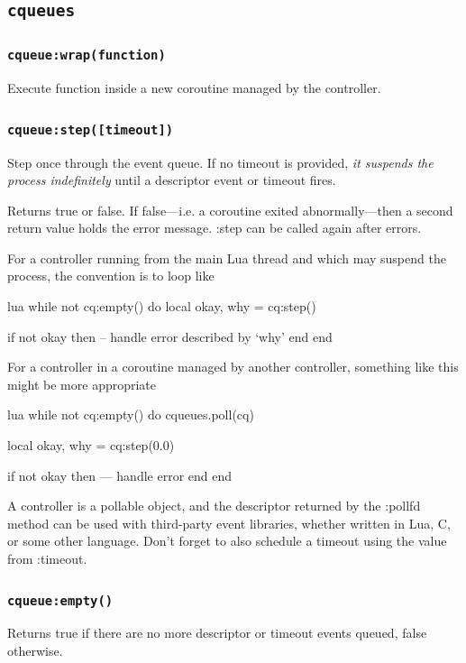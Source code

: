 \documentclass[11pt, oneside]{memoir}
\newcommand*{\cqueues}[0]{\texttt{cqueues}\xspace}
\newcommand*{\routine}[1]{\texttt{#1}\xspace}
\newcounter{toccols}
\newenvironment{Module}[1]{
	\subsection{\texttt{#1}}
	\addtocontents{toc}{
		\protect\begin{multicols}{\value{toccols}}
	}
}{
	\addtocontents{toc}{\protect\end{multicols}}
}
\begin{document}
\begin{Module}{\cqueues}
\subsubsection[\routine{cqueues:wrap}]{\routine{cqueue:wrap(function)}}
        Execute function inside a new coroutine managed by the controller.

\subsubsection[\routine{cqueues:step}]{\routine{cqueue:step([timeout])}}
Step once through the event queue. If no timeout is provided, \emph{it suspends the process indefinitely} until a descriptor event or timeout fires.

Returns true or false. If false---i.e. a coroutine exited abnormally---then a second return value holds the error message. :step can be called again after errors.

For a controller running from the main Lua thread and which may suspend the process, the convention is to loop like

\begin{code}{lua}
while not cq:empty() do
	local okay, why = cq:step()

	if not okay then
		-- handle error described by `why'
	end
end
\end{code}

For a controller in a coroutine managed by another controller, something like this might be more appropriate

\begin{code}{lua}
while not cq:empty() do
	cqueues.poll(cq)

	local okay, why = cq:step(0.0)

	if not okay then
		--- handle error
	end
end
\end{code}

A controller is a pollable object, and the descriptor returned by the :pollfd method can be used with third-party event libraries, whether written in Lua, C, or some other language. Don't forget to also schedule a timeout using the value from :timeout.


\subsubsection[\routine{cqueues:empty}]{\routine{cqueue:empty()}}
Returns true if there are no more descriptor or timeout events queued, false otherwise.


\end{Module}
\end{document}
